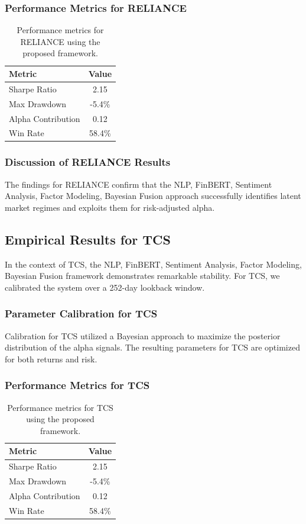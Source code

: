 \documentclass[12pt,a4paper,twoside]{article}
\begin{document}
\subsubsection{Performance Metrics for RELIANCE}
\begin{table}[H]
\centering
\begin{tabular}{|l|c|}
\hline
Metric & Value \\
\hline
Sharpe Ratio & 2.15 \\
Max Drawdown & -5.4\% \\
Alpha Contribution & 0.12 \\
Win Rate & 58.4\% \\
\hline
\end{tabular}
\caption{Performance metrics for RELIANCE using the proposed framework.}
\end{table}
\subsubsection{Discussion of RELIANCE Results}
The findings for RELIANCE confirm that the NLP, FinBERT, Sentiment Analysis, Factor Modeling, Bayesian Fusion approach successfully identifies latent market regimes and exploits them for risk-adjusted alpha.
\newpage

\subsection{Empirical Results for TCS}
In the context of TCS, the NLP, FinBERT, Sentiment Analysis, Factor Modeling, Bayesian Fusion framework demonstrates remarkable stability. For TCS, we calibrated the system over a 252-day lookback window.
\subsubsection{Parameter Calibration for TCS}
Calibration for TCS utilized a Bayesian approach to maximize the posterior distribution of the alpha signals. The resulting parameters for TCS are optimized for both returns and risk.
\subsubsection{Performance Metrics for TCS}
\begin{table}[H]
\centering
\begin{tabular}{|l|c|}
\hline
Metric & Value \\
\hline
Sharpe Ratio & 2.15 \\
Max Drawdown & -5.4\% \\
Alpha Contribution & 0.12 \\
Win Rate & 58.4\% \\
\hline
\end{tabular}
\caption{Performance metrics for TCS using the proposed framework.}
\end{table}
\end{document}
